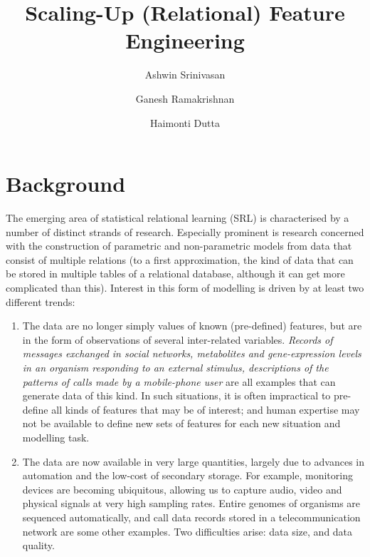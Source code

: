 \documentclass[11pt]{article}
\begin{document}
\title{Scaling-Up (Relational) Feature Engineering}
\author{Ashwin Srinivasan \and Ganesh Ramakrishnan \and  Haimonti Dutta}

\maketitle

\newtheorem{example}{Example}

\section{Background}

The emerging area of statistical relational learning (SRL) is characterised by a number of distinct
strands of research. Especially prominent is research concerned with the construction of
parametric and non-parametric  models from data that consist of multiple relations (to a first approximation, the kind of data that
can be stored in multiple tables of a relational database, although it can get more complicated than this).
Interest in this form of modelling is driven by at least two different trends:
\begin{enumerate}
    \item The data are no longer simply values of known (pre-defined) features, but are in the
        form of observations of several inter-related variables. {\em Records of messages exchanged in social
        networks, metabolites and gene-expression levels in an organism responding to an external stimulus,
        descriptions of the patterns of calls made by a mobile-phone user} are all examples that can generate data of this kind. In
        such situations, it is often impractical to pre-define all kinds of features that may be of interest;
        and human expertise may not be available to define new sets of features for each new situation and
        modelling task.
    \item The data are now available in very large quantities, largely due to advances in automation
            and the low-cost of secondary storage. For example, monitoring devices are becoming ubiquitous,
            allowing us to capture audio, video and physical signals at very high sampling rates. Entire
            genomes of organisms are sequenced automatically, and call data records stored in a
            telecommunication network are some other examples. Two difficulties arise: data size,
            and data quality.
\end{enumerate}
\end{document}
